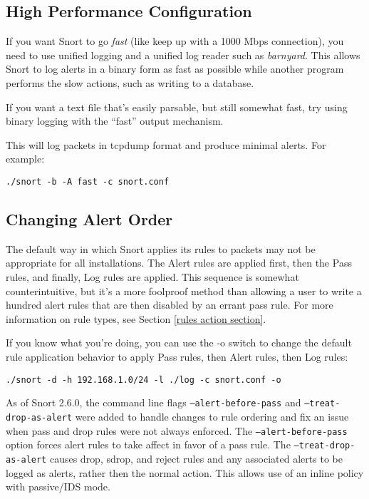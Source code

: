 \documentclass[english]{report}
\begin{document}
\subsection{High Performance Configuration}

If you want Snort to go \emph{fast} (like keep up with a 1000 Mbps connection),
you need to use unified logging and a unified log reader such as
\emph{barnyard}.  This allows Snort to log alerts in a binary form as fast as
possible while another program performs the slow actions, such as writing to a
database.

If you want a text file that's easily parsable, but still somewhat fast, try
using binary logging with the ``fast'' output mechanism. 

This will log packets in tcpdump format and produce minimal alerts. For
example:

\begin{center}
\begin{verbatim}
./snort -b -A fast -c snort.conf
\end{verbatim}
\end{center}

\subsection{Changing Alert Order}

The default way in which Snort applies its rules to packets may not be
appropriate for all installations.  The Alert rules are applied first, then the
Pass rules, and finally, Log rules are applied. This sequence is somewhat
counterintuitive, but it's a more foolproof method than allowing a user to
write a hundred alert rules that are then disabled by an errant pass rule.  For
more information on rule types, see Section \ref{rules action section}.

If you know what you're doing, you can use the -o switch to change the default
rule application behavior to apply Pass rules, then Alert rules, then Log
rules:
\begin{center}
\begin{verbatim}
./snort -d -h 192.168.1.0/24 -l ./log -c snort.conf -o
\end{verbatim}
\end{center}

As of Snort 2.6.0, the command line flags \texttt{--alert-before-pass}
and \texttt{--treat-drop-as-alert} were added to handle changes to rule
ordering and fix an issue when pass and drop rules were not always
enforced.  The \texttt{--alert-before-pass} option forces alert rules
to take affect in favor of a pass rule.  The \texttt{--treat-drop-as-alert}
causes drop, sdrop, and reject rules and any associated alerts to be logged
as alerts, rather then the normal action.  This allows use of an inline
policy with passive/IDS mode.
\end{document}
